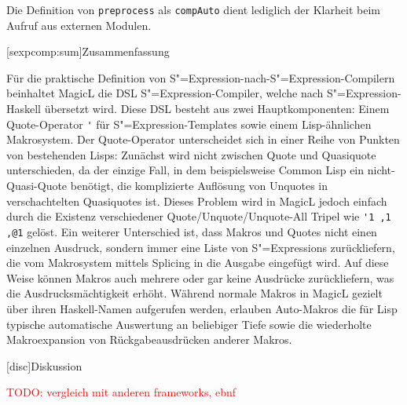 \documentclass[11pt, a4paper, bibgerm]{scrbook}
\newcommand\icode[1]{\lstinline?#1?}
\newcommand{\todo}[1]{
  \textcolor{red}{TODO: #1}
}
\newcommand\lchapter{}
\newcommand\lsection{}
\newcommand{\sexp}{S"=Expression}
\newcommand{\sexps}{S"=Expressions}
\begin{document}
Die Definition von \icode{preprocess} als \icode{compAuto} dient
lediglich der Klarheit beim Aufruf aus externen Modulen.

\lsection[sexpcomp:sum]{Zusammenfassung}

Für die praktische Definition von \sexp{}-nach-\sexp{}-Compilern
beinhaltet MagicL die DSL \sexp{}-Compiler, welche nach \sexp{}-Haskell
übersetzt wird. Diese DSL besteht aus zwei Hauptkomponenten: Einem
Quote-Operator \icode{'} für \sexp{}-Templates sowie einem
Lisp-ähnlichen Makrosystem. Der Quote-Operator unterscheidet sich in
einer Reihe von Punkten von bestehenden Lisps: Zunächst wird nicht
zwischen Quote und Quasiquote unterschieden, da der einzige Fall, in dem
beispielsweise Common Lisp ein nicht-Quasi-Quote benötigt, die
komplizierte Auflösung von Unquotes in verschachtelten Quasiquotes
ist. Dieses Problem wird in MagicL jedoch einfach durch die Existenz
verschiedener Quote/Unquote/Unquote-All Tripel wie \icode{'1 ,1 ,@1}
gelöst. Ein weiterer Unterschied ist, dass Makros und Quotes nicht einen
einzelnen Ausdruck, sondern immer eine Liste von \sexps{} zurückliefern,
die vom Makrosystem mittels Splicing in die Ausgabe eingefügt wird. Auf
diese Weise können Makros auch mehrere oder gar keine Ausdrücke
zurückliefern, was die Ausdrucksmächtigkeit erhöht. Während normale
Makros in MagicL gezielt über ihren Haskell-Namen aufgerufen werden,
erlauben Auto-Makros die für Lisp typische automatische Auswertung an
beliebiger Tiefe sowie die wiederholte Makroexpansion von
Rückgabeausdrücken anderer Makros.

\lchapter[disc]{Diskussion}

\todo{vergleich mit anderen frameworks, ebnf}
\end{document}
